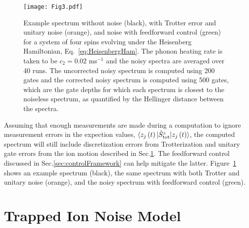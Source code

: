\documentclass[prx,aps,twocolumn,showpacs,superscriptaddress,10pt]{revtex4-1}
\begin{document}
\begin{figure}[t!]
	\centering
	\texttt{[image: Fig3.pdf]}
	\caption{Example spectrum without noise (black), with Trotter error and unitary noise (orange), and noise with feedforward control (green) for a system of four spins evolving under the Heisenberg Hamiltonian, Eq.~\eqref{eq:HeisenbergHam}. The phonon heating rate is taken to be $c_{2}=0.02$ ms$^{-1}$ and the noisy spectra are averaged over 40 runs. The uncorrected noisy spectrum is computed using 200 gates and the corrected noisy spectrum is computed using 500 gates, which are the gate depths for which each spectrum is closest to the noiseless spectrum, as quantified by the Hellinger distance between the spectra.}
	\label{fig:spectrum}
\end{figure}

Assuming that enough measurements are made during a computation to ignore measurement errors in the expection values, $\braket{z_{j}\left(t\right)|\hat{S}_{\text{tot}}^{z}|z_{j}\left(t\right)}$, the computed spectrum will still include discretization errors from Trotterization and unitary gate errors from the ion motion described in Sec.\ref{sec:NoiseModel}. The feedforward control discussed in Sec.\ref{sec:controlFramework} can help mitigate the latter. Figure~\ref{fig:spectrum} shows an example spectrum (black), the same spectrum with both Trotter and unitary noise (orange), and the noisy spectrum with feedforward control (green). 

\section{Trapped Ion Noise Model}
\label{sec:NoiseModel}
\end{document}
